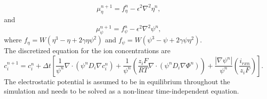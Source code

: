 \documentclass[11pt]{article}
\renewcommand{\=}[1]{\stackrel{#1}{=}} %
\theoremstyle{definition}
\theoremstyle{remark}
\begin{document}
\begin{equation}
\label{mueta_eq_td}
\mu_\eta^{n+1}=f_\eta^n -\epsilon^2 \nabla^2 \eta^n,
\end{equation}
and
\begin{equation}
\label{mupsi_eq_td}
\mu_\psi^{n+1}=f_\psi^n -\epsilon^2 \nabla^2 \psi^n,
\end{equation}
where $f_\eta=W \left( \eta^3 - \eta +2 \gamma \eta \psi^2 \right)$ and $f_\psi= W \left( \psi^3 - \psi +2 \gamma \psi  \eta^2 \right)$.\\
The discretized equation for the ion concentrations are
\begin{equation}
\label{conc_eq_td}
c_i ^{n+1}= c_i^n  + \Delta t  \left[ \frac{1}{\psi^n} \nabla \cdot (\psi^n D_i \nabla c_i^n) + \frac{1}{\psi^n} \left( \frac{z_i F}{RT} \nabla \cdot (\psi^n D_i \nabla \Phi^n) \right)+ \frac{|\nabla \psi^n|}{\psi^n} \left( \frac{i_{rxn}}{z_i F} \right) \right].
\end{equation}
The electrostatic potential is assumed to be in equilibrium throughout the simulation and needs to be solved as a non-linear time-independent equation.
\end{document}
